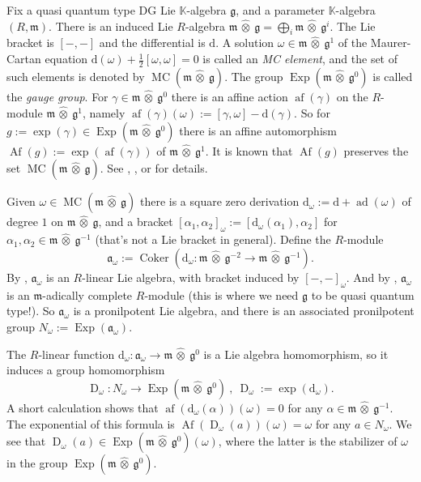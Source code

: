 \documentclass[a4paper, 10pt]{amsart}
\theoremstyle{definition}
\numberwithin{equation}{section}
\newcommand{\opn}{\operatorname}
\newcommand{\mfrak}[1]{\mathfrak{#1}}
\newcommand{\mrm}[1]{\mathrm{#1}}
\newcommand{\mbb}[1]{\mathbb{#1}}
\newcommand{\smfrac}[2]{\textstyle \frac{#1}{#2}}
\newcommand{\hatotimes}[1]{\, \what{{\otimes}}_{#1} \,}
\newcommand{\hot}{\hatotimes{}}
\newcommand{\what}[1]{\widehat{#1}}
\newcommand{\K}{\mbb{K}}
\newcommand{\g}{\mfrak{g}}
\newcommand{\m}{\mfrak{m}}
\renewcommand{\a}{\mfrak{a}}
\newcommand{\om}{\omega}
\newcommand{\al}{\alpha}
\newcommand{\ga}{\gamma}
\renewcommand{\d}{\mrm{d}}
\begin{document}
Fix a quasi quantum type DG Lie $\K$-algebra $\g$, and a parameter $\K$-algebra 
$(R, \m)$. There is an induced Lie $R$-algebra 
$\m \hot \g = \bigoplus_i \m \hot \g^i$.
The Lie bracket is $[-,-]$ and the differential is $\d$.
A solution $\om \in \m \hot \g^1$ of the Maurer-Cartan equation 
$\d(\om) + \smfrac{1}{2} [\om, \om] = 0$
is called an {\em MC element}, and the set of such elements is denoted by
$\opn{MC}(\m \hot \g)$.
The group $\opn{Exp}(\m \hot \g^0)$ is called the {\em gauge group}.
For $\ga \in \m \hot \g^0$ there is an affine action $\opn{af}(\ga)$ on 
the $R$-module $\m \hot \g^1$, 
namely $\opn{af}(\ga)(\om) := [\ga ,\om] - \d(\ga)$.
So for 
$g := \exp(\ga) \in \opn{Exp}(\m \hot \g^0)$
there is an affine automorphism 
$\opn{Af}(g) := \exp(\opn{af}(\ga))$ of $\m \hot \g^1$.
It is known that $\opn{Af}(g)$ preserves the set $\opn{MC}(\m \hot \g)$.
See \cite{GM}, \cite{CKTB}, \cite[Section 3]{Ye1} or \cite[Section 1]{Ye7} for
details.

Given $\om \in \opn{MC}(\m \hot \g)$ there is a square zero derivation
$\d_{\om} :=  \d + \opn{ad}(\om)$ of degree $1$ on $\m \hot \g$, and a bracket 
$[\al_1, \al_2]_{\om} := [ \d_{\om}(\al_1), \al_2 ]$
for $\al_1, \al_2 \in \m \hot \g^{-1}$ (that's not a Lie bracket in general).
Define the $R$-module
\begin{equation} \label{eqn:Lie-desc.110}
\a_{\om} := \opn{Coker}(\d_{\om} : \m \hot \g^{-2} \to 
\m \hot \g^{-1}) .
\end{equation}
By \cite[Proposition 6.6]{Ye7}, $\a_{\om}$ is an $R$-linear Lie algebra, with
bracket induced by  $[-,-]_{\om}$. And by \cite[Proposition 6.7]{Ye7},
$\a_{\om}$ is an $\m$-adically complete $R$-module (this is where we need $\g$
to be quasi quantum type!). So $\a_{\om}$ is a pronilpotent Lie algebra, and
there is an associated pronilpotent group $N_{\om} := \opn{Exp}(\a_{\om})$. 

The $R$-linear function 
$\d_{\om} : \a_{\om} \to \m \hot \g^0$
is a Lie algebra homomorphism, so it induces a group homomorphism 
\begin{equation} \label{eqn:Lie-desc.103}
\opn{D}_{\om} : N_{\om} \to \opn{Exp}(\m \hot \g^0) \ , \
\opn{D}_{\om} := \exp(\d_{\om}) .
\end{equation}
A short calculation shows that 
$\opn{af}(\d_{\om}(\al))(\om) = 0$
for any $\al \in \m \hot \g^{-1}$. The exponential of this formula is 
$\opn{Af}(\opn{D}_{\om}(a))(\om) = \om$ for any $a \in N_{\om}$.
We see that 
$\opn{D}_{\om}(a) \in \opn{Exp}(\m \hot \g^0)(\om)$,
where the latter is the stabilizer of $\om$ in the group $\opn{Exp}(\m \hot
\g^0)$.  
\end{document}
